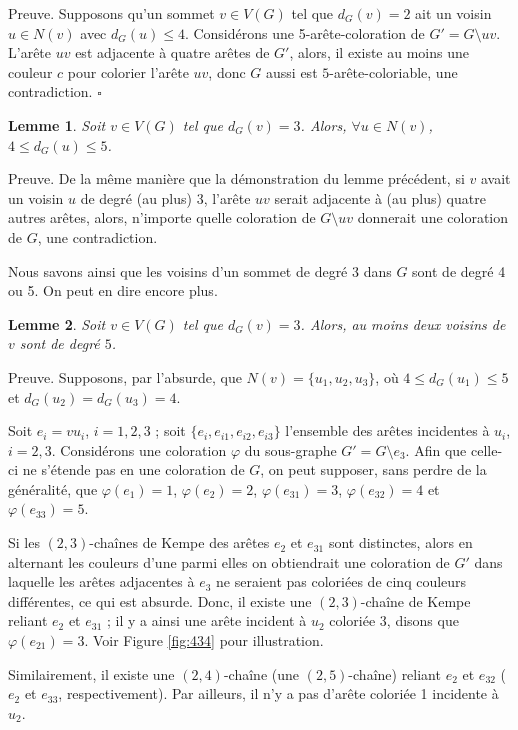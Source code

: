 \documentclass[10pt,a4paper]{article}
\newtheorem{lemme}{Lemme}
\newcommand{\ep}{{\hfill $\square$}}
\begin{document}
Preuve.
Supposons qu'un sommet $v \in V(G)$ tel que $d_G(v) = 2$ ait un voisin $u \in N(v)$ avec $d_G(u)  \le 4$. Considérons une 5-arête-coloration de $G' = G \setminus uv$.
L'arête $uv$ est adjacente à quatre arêtes de $G'$, alors, il existe au moins une couleur $c$ pour colorier l'arête $uv$, donc $G$ aussi est $5$-arête-coloriable,  une contradiction.
\ep


\begin{lemme}
Soit $v\in V(G)$ tel que $d_G(v) = 3$. Alors, $\forall u \in N(v)$, $4\le d_G(u) \le 5$.
\label{le:33}
\end{lemme}

Preuve. De la même manière que la démonstration du lemme précédent, si $v$ avait un voisin $u$ de degré (au plus) 3, l'arête $uv$ serait adjacente à (au plus) quatre autres arêtes, alors, n'importe quelle coloration de $G\setminus uv$ donnerait une coloration de $G$, une contradiction.

Nous savons ainsi que les voisins d'un sommet de degré 3 dans $G$ sont de degré 4 ou 5. On peut en dire encore plus.

\begin{lemme}
Soit $v\in V(G)$ tel que $d_G(v) = 3$. Alors, au moins deux voisins de $v$ sont de degré $5$.
\label{le:434}
\end{lemme}

Preuve.
Supposons, par l'absurde, que $N(v)=\{u_1,u_2,u_3\}$, où $4\le d_G(u_1) \le 5$ et  $d_G(u_2) = d_G(u_3) = 4$. 

Soit $e_i=vu_i$, $i=1,2,3$ ; soit $\{e_i,e_{i1},e_{i2},e_{i3}\}$ l'ensemble des arêtes incidentes à $u_i$, $i=2,3$. 
Considérons une coloration $\varphi$ du sous-graphe $G' = G \setminus e_3$. Afin que celle-ci ne s'étende pas en une coloration de $G$, on peut supposer, sans perdre de la généralité, que $\varphi(e_1) = 1$, $\varphi(e_2) = 2$, $\varphi(e_{31}) = 3$, $\varphi(e_{32}) = 4$ et $\varphi(e_{33}) = 5$.

Si les $(2,3)$-chaînes de Kempe des arêtes $e_2$ et $e_{31}$ sont distinctes, alors en alternant les couleurs d'une parmi elles on obtiendrait une coloration de $G'$ dans laquelle les arêtes adjacentes à $e_3$ ne seraient pas coloriées de cinq couleurs différentes, ce qui est absurde.
Donc, il existe une $(2,3)$-chaîne de Kempe reliant $e_2$ et $e_{31}$ ; il y a ainsi une arête incident à $u_2$ coloriée 3, disons que $\varphi(e_{21})=3$. Voir Figure \ref{fig:434} pour illustration.

Similairement, il existe une $(2,4)$-chaîne (une $(2,5)$-chaîne) reliant $e_2$ et $e_{32}$ ($e_2$ et $e_{33}$, respectivement). Par ailleurs, il n'y a pas d'arête coloriée 1 incidente à $u_2$.
\end{document}
